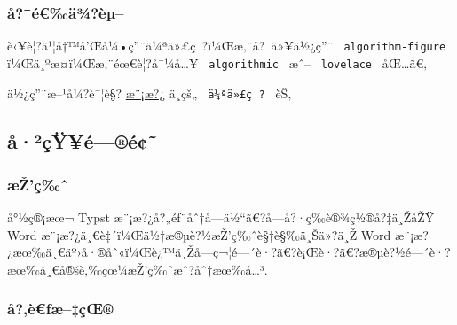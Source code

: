 \subsubsection{å?¯é€‰ä¾?èµ--}\label{uxe5uxe9uxe4uxbeuxe8uxb5}

è‹¥è¦?ä¹¦å†™å'Œå¼•ç''¨ä¼ªä»£ç~?ï¼Œæ‚¨å?¯ä»¥ä½¿ç''¨
\texttt{\ algorithm-figure\ } ï¼Œä¸ºæ­¤ï¼Œæ‚¨éœ€è¦?å¯¼å\ldots¥
\texttt{\ algorithmic\ } æˆ-- \texttt{\ lovelace\ } åŒ\ldots ã€‚

\begin{Shaded}
\begin{Highlighting}[]

\end{Highlighting}
\end{Shaded}

ä½¿ç''¨æ--¹å¼?è¯¦è§?
\href{https://github.com/chosertech/HIT-Thesis-Typst/blob/main/templates/universal-bachelor.typ}{æ¨¡æ?¿}
ä¸­çš„ \texttt{\ ä¼ªä»£ç~?\ } èŠ‚

\subsection{å·²çŸ¥é---®é¢˜}\label{uxe5uxb2uxe7uxffuxe9uxe9}

\subsubsection{æŽ'ç‰ˆ}\label{uxe6ux17euxe7ux2c6}

å°½ç®¡æœ¬ Typst æ¨¡æ?¿å?„éƒ¨åˆ†å­---ä½``ã€?å­---å?·ç­‰è®¾ç½®å?‡ä¸ŽåŽŸ Word
æ¨¡æ?¿ä¸€è‡´ï¼Œä½†æ®µè?½æŽ'ç‰ˆè§†è§‰ä¸Šä»?ä¸Ž Word
æ¨¡æ?¿æœ‰ä¸€äº›å·®åˆ«ï¼Œè¿™ä¸Žå­---ç¬¦é---´è·?ã€?è¡Œè·?ã€?æ®µè?½é---´è·?æœ‰ä¸€å®šè‚‰çœ¼æŽ'ç‰ˆæˆ?åˆ†æœ‰å\ldots³.

\subsubsection{å?‚è€ƒæ--‡çŒ®}\label{uxe5uxe8ux192uxe6uxe7ux153}

